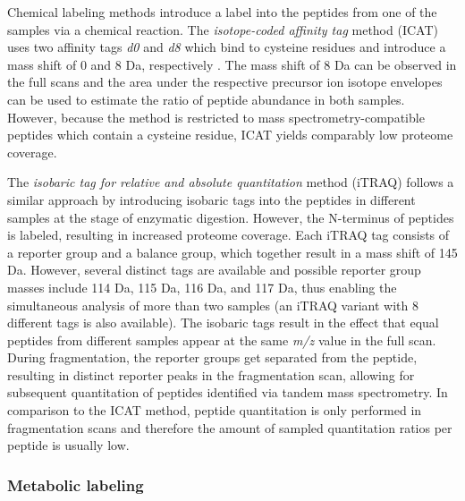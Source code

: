 Chemical labeling methods introduce a label into the peptides from one of the 
samples via a chemical reaction. 
The {\em isotope-coded affinity tag} method (ICAT) 
uses two affinity tags {\em d0} and {\em d8} which bind to cysteine residues
and introduce a mass shift of 0 and 8 Da, respectively \citep{Gygi1999}.
The mass shift of 8 Da can be observed in the full scans and the area under
the respective precursor ion isotope envelopes can be used to estimate
the ratio of peptide abundance in both samples.
However, because the method is restricted to mass spectrometry-compatible 
peptides which contain a cysteine residue, ICAT yields comparably low proteome
coverage.

The {\em isobaric tag for relative and absolute quantitation} method (iTRAQ)
follows a similar approach by introducing isobaric tags into the peptides in
different samples \citep{Ross2004} at the stage of enzymatic digestion.
However, the N-terminus of peptides is labeled, resulting in increased proteome
coverage.
Each iTRAQ tag consists of a reporter group and a balance group, which together 
result in a mass shift of 145 Da. 
However, several distinct tags are available and possible reporter group masses 
include 114 Da, 115 Da, 116 Da, and 117 Da, thus enabling the simultaneous 
analysis of more than two samples (an iTRAQ variant with 8 different tags is also
available).
The isobaric tags result in the effect that equal peptides from different 
samples appear at the same {\em m/z} value in the full scan.
During fragmentation, the reporter groups get separated from the peptide, 
resulting in distinct reporter peaks in the fragmentation scan, allowing
for subsequent quantitation of peptides identified via tandem mass spectrometry.
In comparison to the ICAT method, peptide quantitation is only performed in 
fragmentation scans and therefore the amount of sampled quantitation ratios 
per peptide is usually low.

\subsubsection{Metabolic labeling}


